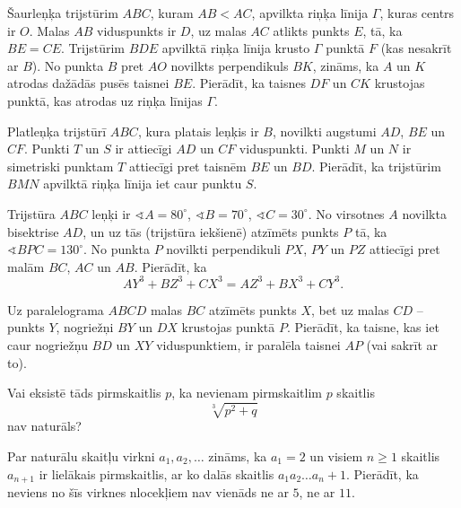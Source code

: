 \documentclass[11pt]{article}
\begin{document}
\begin{problem}[BW.TST.2018.9]
Šaurleņķa trijstūrim $ABC$, kuram $AB < AC$, apvilkta riņķa līnija $\Gamma$, kuras centrs ir $O$. 
Malas $AB$ viduspunkts ir $D$, uz malas $AC$ atlikts punkts $E$, tā, ka $BE = CE$. 
Trijstūrim $BDE$ apvilktā riņķa līnija krusto $\Gamma$ punktā $F$ (kas nesakrīt ar $B$). 
No punkta $B$ pret $AO$ novilkts perpendikuls $BK$, zināms, ka $A$ un $K$
atrodas dažādās pusēs taisnei $BE$. Pierādīt, ka taisnes $DF$ un $CK$ krustojas punktā, kas atrodas
uz riņķa līnijas $\Gamma$. 
\end{problem}

\begin{problem}[BW.TST.2018.10]
Platleņķa trijstūrī $ABC$, kura platais leņķis ir $B$, novilkti augstumi $AD$, $BE$ un $CF$. Punkti 
$T$ un $S$ ir attiecīgi $AD$ un $CF$ viduspunkti. Punkti $M$ un $N$ ir simetriski punktam $T$ attiecīgi pret
taisnēm $BE$ un $BD$. Pierādīt, ka trijstūrim $BMN$ apvilktā riņķa līnija iet caur punktu $S$. 
\end{problem}

\begin{problem}[BW.TST.2018.11]
Trijstūra $ABC$ leņķi ir $\sphericalangle A = 80^{\circ}$, $\sphericalangle B = 70^{\circ}$, $\sphericalangle C = 30^{\circ}$. 
No virsotnes $A$ novilkta bisektrise $AD$, un uz tās (trijstūra iekšienē) atzīmēts punkts $P$ tā, ka 
$\sphericalangle BPC = 130^{\circ}$. No punkta $P$ novilkti perpendikuli $PX$, $PY$ un $PZ$ attiecīgi pret 
malām $BC$, $AC$ un $AB$. Pierādīt, ka 
\[ AY^3 + BZ^3 + CX^3 = AZ^3 + BX^3 + CY^3. \] 
\end{problem}

\begin{problem}[BW.TST.2018.12]
Uz paralelograma $ABCD$ malas $BC$ atzīmēts punkts $X$, bet uz malas $CD$ -- punkts $Y$, nogriežņi $BY$ un $DX$ krustojas punktā $P$. 
Pierādīt, ka taisne, kas iet caur nogriežņu $BD$ un $XY$ viduspunktiem, ir paralēla taisnei $AP$ (vai sakrīt ar to). 
\end{problem}

\begin{problem}[BW.TST.2018.13]
Vai eksistē tāds pirmskaitlis $p$, ka nevienam pirmskaitlim $p$ skaitlis
\[ \sqrt[3]{p^2 + q} \]
nav naturāls?
\end{problem}

\begin{problem}[BW.TST.2018.14]
Par naturālu skaitļu virkni $a_1,a_2,\ldots$ zināms, ka $a_1 = 2$ un visiem $n \geq 1$ skaitlis 
$a_{n+1}$ ir lielākais pirmskaitlis, ar ko dalās skaitlis $a_1a_2\ldots{}a_n + 1$. Pierādīt, ka neviens no 
šīs virknes nlocekļiem nav vienāds ne ar $5$, ne ar $11$.
\end{problem}
\end{document}
